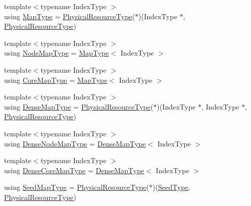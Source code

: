 \begin{DoxyCompactItemize}
\item 
{\footnotesize template$<$typename Index\+Type $>$ }\\using \hyperlink{namespacevt_1_1mapping_a443f8bb8920af5ae1d3391f61fe492a6}{Map\+Type} = \hyperlink{namespacevt_a2dc36fcada816dc6d11774d650328ee9}{Physical\+Resource\+Type}($\ast$)(Index\+Type $\ast$, \hyperlink{namespacevt_a2dc36fcada816dc6d11774d650328ee9}{Physical\+Resource\+Type})
\item 
{\footnotesize template$<$typename Index\+Type $>$ }\\using \hyperlink{namespacevt_1_1mapping_a8dbe779cb3e28ed8c424bcc8826765b9}{Node\+Map\+Type} = \hyperlink{namespacevt_1_1mapping_a443f8bb8920af5ae1d3391f61fe492a6}{Map\+Type}$<$ Index\+Type $>$
\item 
{\footnotesize template$<$typename Index\+Type $>$ }\\using \hyperlink{namespacevt_1_1mapping_abff207bec72f006a2e66ff14fc51255a}{Core\+Map\+Type} = \hyperlink{namespacevt_1_1mapping_a443f8bb8920af5ae1d3391f61fe492a6}{Map\+Type}$<$ Index\+Type $>$
\item 
{\footnotesize template$<$typename Index\+Type $>$ }\\using \hyperlink{namespacevt_1_1mapping_a64f0fc107b569bb6644f1b015c6e7ad8}{Dense\+Map\+Type} = \hyperlink{namespacevt_a2dc36fcada816dc6d11774d650328ee9}{Physical\+Resource\+Type}($\ast$)(Index\+Type $\ast$, Index\+Type $\ast$, \hyperlink{namespacevt_a2dc36fcada816dc6d11774d650328ee9}{Physical\+Resource\+Type})
\item 
{\footnotesize template$<$typename Index\+Type $>$ }\\using \hyperlink{namespacevt_1_1mapping_a224f382367a2c65c3be2a9f91f89ffd5}{Dense\+Node\+Map\+Type} = \hyperlink{namespacevt_1_1mapping_a64f0fc107b569bb6644f1b015c6e7ad8}{Dense\+Map\+Type}$<$ Index\+Type $>$
\item 
{\footnotesize template$<$typename Index\+Type $>$ }\\using \hyperlink{namespacevt_1_1mapping_ac198c707792d29c7e3106fb89c3f3f92}{Dense\+Core\+Map\+Type} = \hyperlink{namespacevt_1_1mapping_a64f0fc107b569bb6644f1b015c6e7ad8}{Dense\+Map\+Type}$<$ Index\+Type $>$
\item 
using \hyperlink{namespacevt_1_1mapping_a1c1409d9af8d1ac402af022a65be4a4d}{Seed\+Map\+Type} = \hyperlink{namespacevt_a2dc36fcada816dc6d11774d650328ee9}{Physical\+Resource\+Type}($\ast$)(\hyperlink{namespacevt_ae2e13198bdef4d5b8e603d6c1c7f0969}{Seed\+Type}, \hyperlink{namespacevt_a2dc36fcada816dc6d11774d650328ee9}{Physical\+Resource\+Type})

\end{DoxyCompactItemize}
